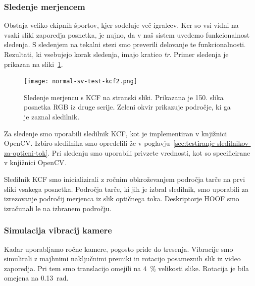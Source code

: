 \subsubsection{Sledenje merjencem}\label{sec:tracking}
Obstaja veliko ekipnih športov, kjer sodeluje več igralcev. Ker so vsi vidni na vsaki sliki zaporedja posnetka, je nujno, da v naš sistem uvedemo funkcionalnost sledenja. S sledenjem na tekalni stezi smo preverili delovanje te funkcionalnosti. Rezultati, ki vsebujejo korak sledenja, imajo kratico \textit{tr}. Primer sledenja je prikazan na sliki~\ref{fig:sledenje}.

\begin{figure}[!htb]
	\centering
	\texttt{[image: normal-sv-test-kcf2.png]}
	\caption[Sledenje merjencu s KCF na stranski sliki]{Sledenje merjencu s KCF na stranski sliki. Prikazana je 150. slika posnetka RGB iz druge serije. Zeleni okvir prikazuje področje, ki ga je zaznal sledilnik.}
	\label{fig:sledenje}
\end{figure} 

Za sledenje smo uporabili sledilnik KCF, kot je implementiran v knjižnici OpenCV. Izbiro sledilnika smo opredelili že v poglavju~\ref{sec:testiranje-sledilnikov-za-opticni-tok}. Pri sledenju smo uporabili privzete vrednosti, kot so specificirane v knjižnici OpenCV.

Sledilnik KCF smo inicializirali z ročnim obkroževanjem področja tarče na prvi sliki vsakega posnetka. Področja tarče, ki jih je izbral sledilnik, smo uporabili za izrezovanje področij merjenca iz slik optičnega toka. Deskriptorje HOOF smo izračunali le na izbranem področju. 



\subsubsection{Simulacija vibracij kamere}
Kadar uporabljamo ročne kamere, pogosto pride do tresenja. Vibracije smo simulirali z majhnimi naključnimi premiki in rotacijo posameznih slik iz video zaporedja. Pri tem smo translacijo omejili na \SI{4}{\%} velikosti slike. Rotacija je bila omejena na \SI{0.13}{rad}. 

